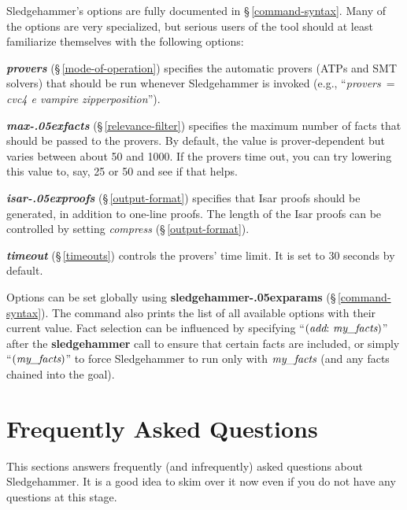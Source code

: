 \documentclass[a4paper,12pt]{article}
\let\oldS=\S
\def\S{\oldS\,}
\renewcommand\_{\hbox{\textunderscore\kern-.05ex}}
\begin{document}

Sledgehammer's options are fully documented in \S\ref{command-syntax}. Many of
the options are very specialized, but serious users of the tool should at least
familiarize themselves with the following options:

\begin{enum}
\item[\labelitemi] \textbf{\textit{provers}} (\S\ref{mode-of-operation}) specifies
the automatic provers (ATPs and SMT solvers) that should be run whenever
Sledgehammer is invoked (e.g., ``\textit{provers}~= \textit{cvc4 e
vampire zipperposition\/}'').

\item[\labelitemi] \textbf{\textit{max\_facts}} (\S\ref{relevance-filter})
specifies the maximum number of facts that should be passed to the provers. By
default, the value is prover-dependent but varies between about 50 and 1000. If
the provers time out, you can try lowering this value to, say, 25 or 50 and see
if that helps.

\item[\labelitemi] \textbf{\textit{isar\_proofs}} (\S\ref{output-format}) specifies
that Isar proofs should be generated, in addition to one-line proofs. The length
of the Isar proofs can be controlled by setting \textit{compress}
(\S\ref{output-format}).

\item[\labelitemi] \textbf{\textit{timeout}} (\S\ref{timeouts}) controls the
provers' time limit. It is set to 30 seconds by default.
\end{enum}

Options can be set globally using \textbf{sledgehammer\_params}
(\S\ref{command-syntax}). The command also prints the list of all available
options with their current value. Fact selection can be influenced by specifying
``$(\textit{add}{:}~\textit{my\_facts})$'' after the \textbf{sledgehammer} call
to ensure that certain facts are included, or simply ``$(\textit{my\_facts})$''
to force Sledgehammer to run only with $\textit{my\_facts}$ (and any facts
chained into the goal).


\section{Frequently Asked Questions}
\label{frequently-asked-questions}

This sections answers frequently (and infrequently) asked questions about
Sledgehammer. It is a good idea to skim over it now even if you do not have any
questions at this stage.
\end{document}
